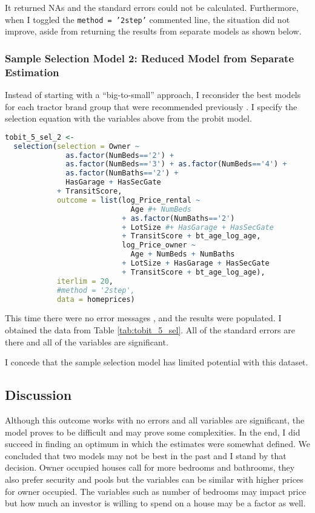 It returned NAs and the standard errors could not be calculated.
Furthermore, when I toggled the \texttt{method = '2step'} commented line, 
the situation did not improve, aside from returning the results from separate models as shown below. 

% 


\subsubsection{Sample Selection Model 2: Reduced Model from Separate Estimation}

Instead of starting with a ``big-to-small'' approach,
I reconsider the best models for each tractor brand group 
that were recommended previously .
I specify the selection equation with the variables above
from the probit model.


\begin{lstlisting}[language=R]
tobit_5_sel_2 <-
  selection(selection = Owner ~
              as.factor(NumBeds=='2') + 
              as.factor(NumBeds=='3') + as.factor(NumBeds=='4') +
              as.factor(NumBaths=='2') +
              HasGarage + HasSecGate
            + TransitScore,
            outcome = list(log_Price_rental ~
                             Age #+ NumBeds 
                           + as.factor(NumBaths=='2')
                           + LotSize #+ HasGarage + HasSecGate
                           + TransitScore + bt_age_log_age,
                           log_Price_owner ~
                             Age + NumBeds + NumBaths
                           + LotSize + HasGarage + HasSecGate
                           + TransitScore + bt_age_log_age),
            iterlim = 20,
            #method = '2step',
            data = homeprices)

\end{lstlisting}

This time there were no error messages , 
and the results were populated. 
I obtained the data from Table \ref{tab:tobit_5_sel}. 
All of the standard errors are there and all of the variables are significant.


I concede that the sample selection model has limited potential
with this dataset. 

\subsection{Discussion}

Although this outcome works with no errors and all variables are significant, the model proves to be difficult and may prove some complexities.
% 
In the end, I did succeed in finding an optimum in which the estimates were somewhat defined. We concluded that two models may not be best in the past and I stand by that decision. Owner occupied houses call for more bedrooms and bathrooms, they also prefer security and pools but the variables can be similar with higher prices for owner occupied.
The variables such as number of bedrooms may impact price but how much an investor is willing to spend on a house may be a factor as well.





%
